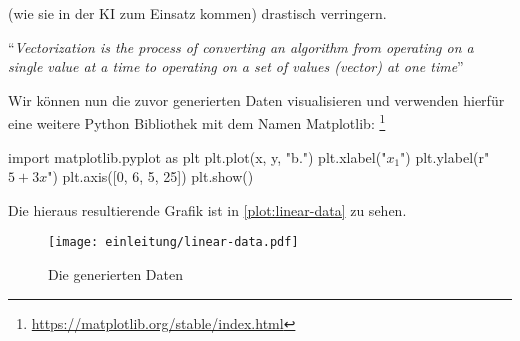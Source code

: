(wie sie in der KI zum Einsatz kommen) drastisch verringern.
\begin{aquote}{\parencite{online:vectorization}}
  \enquote{\textit{Vectorization is the process of converting an algorithm
      from operating on a single value at a time to
      operating on a set of values (vector) at one time}}
\end{aquote}
Wir können nun die zuvor generierten Daten visualisieren und verwenden hierfür
eine weitere Python Bibliothek mit dem Namen Matplotlib:
\footnote{\url{https://matplotlib.org/stable/index.html}}
\begin{pythoncode}
import matplotlib.pyplot as plt
plt.plot(x, y, "b.")
plt.xlabel("$x_1$")
plt.ylabel(r"$5 + 3x$")
plt.axis([0, 6, 5, 25])
plt.show()
\end{pythoncode}
\noindent
Die hieraus resultierende Grafik ist in \autoref{plot:linear-data} zu sehen.
\begin{figure}[!h]
  \centering
  \texttt{[image: einleitung/linear-data.pdf]}
  \caption{Die generierten Daten}
  \label{plot:linear-data}
\end{figure}

